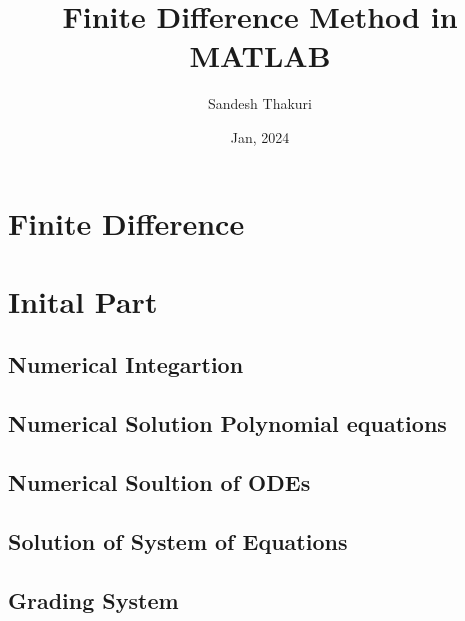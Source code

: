 \documentclass[a4paper,14pt,twoside,onecolumn,openany,final]{memoir}
\author{Sandesh Thakuri}
\title{Finite Difference Method in MATLAB}
\date{Jan, 2024}
\begin{document}
\frontmatter



\tableofcontents
\mainmatter

\part{Finite Difference}


\part{Inital Part}

\chapter{Numerical Integartion}


\chapter{Numerical Solution Polynomial equations}


\chapter{Numerical Soultion of ODEs}


\chapter{Solution of System of Equations}


\chapter{Grading System}

\end{document}
